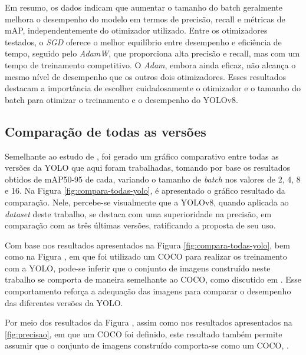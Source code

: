 Em resumo, os dados indicam que aumentar o tamanho do batch geralmente melhora o desempenho do modelo em termos de precisão, recall e métricas de mAP, independentemente do otimizador utilizado. Entre os otimizadores testados, o \textit{SGD} oferece o melhor equilíbrio entre desempenho e eficiência de tempo, seguido pelo \textit{AdamW}, que proporciona alta precisão e recall, mas com um tempo de treinamento competitivo. O \textit{Adam}, embora ainda eficaz, não alcança o mesmo nível de desempenho que os outros dois otimizadores. Esses resultados destacam a importância de escolher cuidadosamente o otimizador e o tamanho do batch para otimizar o treinamento e o desempenho do YOLOv8.

\subsection{Comparação de todas as versões}

Semelhante ao estudo de \cite{ultralytics2023yolo}, foi gerado um gráfico comparativo entre todas as versões da YOLO que aqui foram trabalhadas, tomando por base os resultados obtidos de mAP50-95 de cada, variando o tamanho de \textit{batch} nos valores de 2, 4, 8 e 16. Na Figura \ref{fig:compara-todas-yolo}, é apresentado o gráfico resultado da comparação. Nele, percebe-se visualmente que a YOLOv8, quando aplicada ao \textit{dataset} deste trabalho, se destaca com uma superioridade na precisão, em comparação com as três últimas versões, ratificando a proposta de seu uso. 

Com base nos resultados apresentados na Figura \ref{fig:compara-todas-yolo}, bem como na Figura \cite{padilla2020survey}, em que foi utilizado um COCO para realizar os treinamento com a YOLO, pode-se inferir que o conjunto de imagens construído neste trabalho se comporta de maneira semelhante ao COCO, como discutido em \cite{padilla2020survey}. Esse comportamento reforça a adequação das imagens para comparar o desempenho das diferentes versões da YOLO.

Por meio dos resultados da Figura , assim como nos resultados apresentados na \ref{fig:precisao}, em que um COCO foi definido, este resultado também permite assumir que o conjunto de imagens construído comporta-se como um COCO, \cite{padilla2020survey}.

